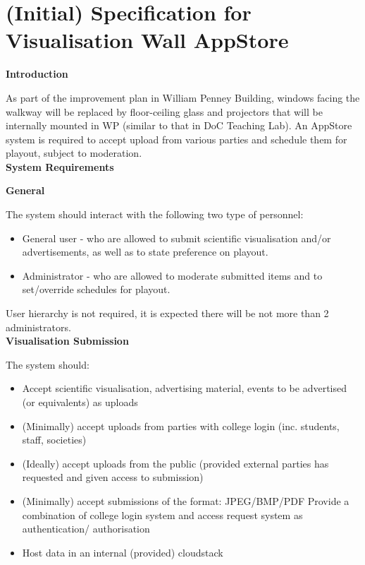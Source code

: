 \documentclass[a4paper, titlepage]{article}
\begin{document}
\newpage
\appendix

\section{(Initial) Specification for Visualisation Wall AppStore}

\textbf{\Large Introduction}

As part of the improvement plan in William Penney Building, windows facing the walkway will be replaced by floor-ceiling glass and projectors that will be internally mounted in WP (similar to that in DoC Teaching Lab). An AppStore system is required to accept upload from various parties and schedule them for playout, subject to moderation.\\

\textbf{\Large System Requirements} \vspace{5pt}

\textbf{\large General}

The system should interact with the following two type of personnel:

\begin{itemize}
  \item General user - who are allowed to submit scientific visualisation and/or advertisements, as well as to state preference on playout.
  \item Administrator - who are allowed to moderate submitted items and to set/override schedules for playout.
\end{itemize}

User hierarchy is not required, it is expected there will be not more than 2 administrators.\\

\textbf{\large Visualisation Submission}

The system should:

\begin{itemize}
\item Accept scientific visualisation, advertising material, events to be advertised (or equivalents) as uploads
\item (Minimally) accept uploads from parties with college login (inc. students, staff, societies)
\item (Ideally) accept uploads from the public (provided external parties has requested and given access to submission)
\item (Minimally) accept submissions of the format: JPEG/BMP/PDF Provide a combination of college login system and access request system as authentication/ authorisation
\item Host data in an internal (provided) cloudstack\\
\end{itemize}
\end{document}
